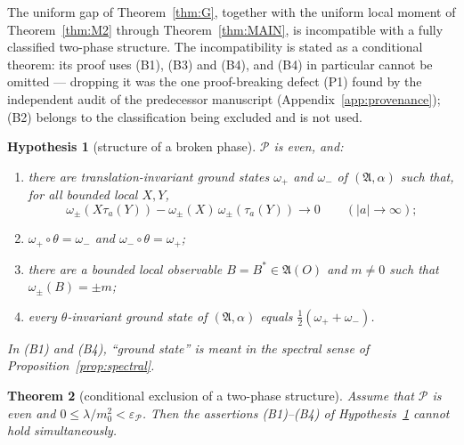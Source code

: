 \documentclass[11pt,a4paper]{article}
\theoremstyle{plain}
\newtheorem{theorem}{Theorem}[section]
\newtheorem{hypothesis}[theorem]{Hypothesis}
\theoremstyle{definition}
\theoremstyle{plain}
\theoremstyle{definition}
\newcommand{\A}{\mathfrak{A}}
\begin{document}
The uniform gap of Theorem~\ref{thm:G}, together with the uniform local moment of
Theorem~\ref{thm:M2} through Theorem~\ref{thm:MAIN}, is incompatible with a fully classified
two-phase structure. The incompatibility is stated as a conditional theorem: its proof uses
(B1), (B3) and (B4), and (B4) in particular cannot be omitted --- dropping
it was the one proof-breaking defect (P1) found by the independent audit of the
predecessor manuscript (Appendix~\ref{app:provenance}); (B2) belongs to the classification
being excluded and is not used.

\begin{hypothesis}[structure of a broken phase]\label{hyp:broken}
$\mathscr P$ is even, and:
\begin{enumerate}
\item[\rm(B1)] there are translation-invariant ground states $\omega_+$ and $\omega_-$ of
      $(\A,\alpha)$ such that, for all bounded local $X,Y$,
      \[
       \omega_\pm(X\tau_a(Y))-\omega_\pm(X)\,\omega_\pm(\tau_a(Y))
       \longrightarrow0\qquad(|a|\to\infty);
      \]
\item[\rm(B2)] $\omega_+\circ\theta=\omega_-$ and $\omega_-\circ\theta=\omega_+$;
\item[\rm(B3)] there are a bounded local observable $B=B^*\in\A(O)$ and $m\ne0$ such that
      $\omega_\pm(B)=\pm m$;
\item[\rm(B4)] every $\theta$-invariant ground state of $(\A,\alpha)$ equals
      $\tfrac12(\omega_++\omega_-)$.
\end{enumerate}
In (B1) and (B4), ``ground state'' is meant in the spectral sense of
Proposition~\ref{prop:spectral}.
\end{hypothesis}

\begin{theorem}[conditional exclusion of a two-phase structure]\label{thm:dichotomy}
Assume that $\mathscr P$ is even and $0\le\lambda/m_0^2<\varepsilon_{\mathscr P}$. Then
the assertions {\rm(B1)}--{\rm(B4)} of Hypothesis~\ref{hyp:broken} cannot hold
simultaneously.
\end{theorem}
\end{document}
